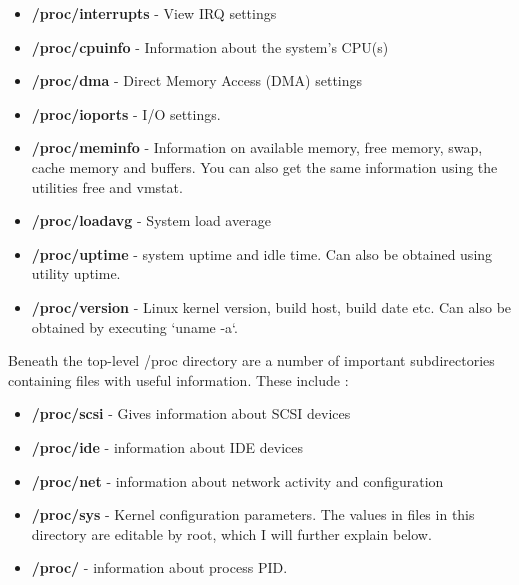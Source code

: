 
\begin{itemize}[noitemsep]

	\item \textbf{/proc/interrupts} - View IRQ settings

	\item \textbf{/proc/cpuinfo} - Information about the system's CPU(s)

	\item \textbf{/proc/dma} - Direct Memory Access (DMA) settings

	\item \textbf{/proc/ioports} - I/O settings.

	\item \textbf{/proc/meminfo} - Information on available memory, free memory,
		swap, cache memory and buffers. You can also get the same information
		using the utilities free and vmstat.

	\item \textbf{/proc/loadavg} - System load average

	\item \textbf{/proc/uptime} - system uptime and idle time. Can also be
		obtained using utility uptime.

	\item \textbf{/proc/version} - Linux kernel version, build host, build date
		etc. Can also be obtained by executing `uname -a`.

\end{itemize}


Beneath the top-level /proc directory are a number of important subdirectories containing files with useful information. These include :


\begin{itemize}[noitemsep]

	\item \textbf{/proc/scsi} - Gives information about SCSI devices

	\item \textbf{/proc/ide} - information about IDE devices

	\item \textbf{/proc/net} - information about network activity and
		configuration

	\item \textbf{/proc/sys} - Kernel configuration parameters. The values in
		files in this directory are editable by root, which I will further
		explain below.

	\item \textbf{/proc/} - information about process PID.

\end{itemize}

